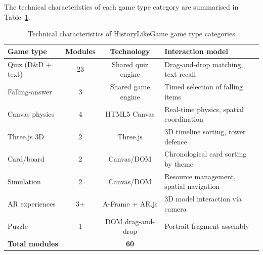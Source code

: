 The technical characteristics of each game type category are summarised in Table~\ref{tab:game-detail}.

\begin{table}[!h]
\centering
\caption{Technical characteristics of HistoryLikeGame game type categories}
\label{tab:game-detail}
\small
\begin{tabular}{lccp{4.5cm}}
\hline
\textbf{Game type} & \textbf{Modules} & \textbf{Technology} & \textbf{Interaction model} \\
\hline
Quiz (D\&D + text) & 23 & Shared quiz engine & Drag-and-drop matching, text recall \\
Falling-answer & 3 & Shared game engine & Timed selection of falling items \\
Canvas physics & 4 & HTML5 Canvas & Real-time physics, spatial coordination \\
Three.js 3D & 2 & Three.js & 3D timeline sorting, tower defence \\
Card/board & 2 & Canvas/DOM & Chronological card sorting by theme \\
Simulation & 2 & Canvas/DOM & Resource management, spatial navigation \\
AR experiences & 3+ & A-Frame + AR.js & 3D model interaction via camera \\
Puzzle & 1 & DOM drag-and-drop & Portrait fragment assembly \\
\hline
\multicolumn{2}{l}{\textbf{Total modules}} & \textbf{60} & \\
\hline
\end{tabular}
\end{table}

